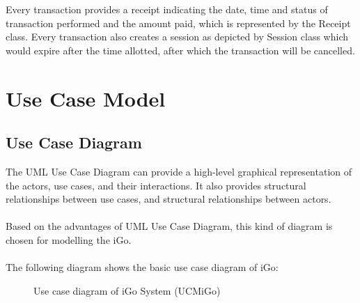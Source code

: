 \documentclass[12pt]{report}
\begin{document}
Every transaction provides a receipt indicating the date, time and status of transaction performed and the amount paid, which is represented by the Receipt class. Every transaction also creates a session as depicted by Session class which would expire after the time allotted, after which the transaction will be cancelled.

\chapter{Use Case Model}
\section{Use Case Diagram}
The UML Use Case Diagram can provide a high-level graphical representation of the actors, use cases, and their interactions. It also provides structural relationships between use cases, and structural relationships between actors.\\
\\
Based on the advantages of UML Use Case Diagram, this kind of diagram is chosen for modelling the iGo.\\
\\
The following diagram shows the basic use case diagram of iGo:
\begin{figure}[htb]
\centering
\begin{adjustwidth}{-2cm}{}
  \caption{Use case diagram of iGo System (UCMiGo)}
\end{adjustwidth} 
\end{figure} 
\end{document}
